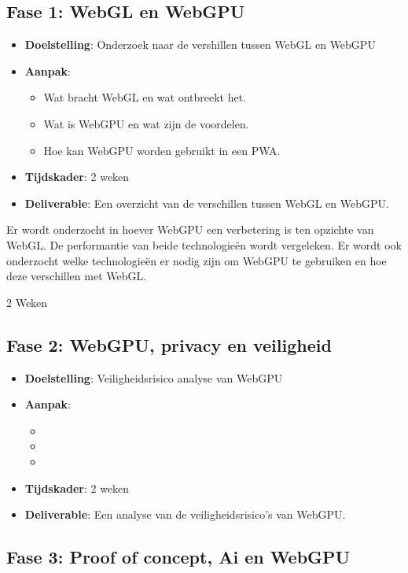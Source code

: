 \documentclass{hogent-article}
\begin{document}
\subsection*{Fase 1: WebGL en WebGPU}

\begin{itemize}
\item \textbf{Doelstelling}: Onderzoek naar de vershillen tussen WebGL en WebGPU
\item \textbf{Aanpak}:
\begin{itemize}
\item Wat bracht WebGL en wat ontbreekt het.
\item Wat is WebGPU en wat zijn de voordelen.
\item Hoe kan WebGPU worden gebruikt in een PWA.
\end{itemize}
\item \textbf{Tijdskader}: 2 weken
\item \textbf{Deliverable}: Een overzicht van de verschillen tussen WebGL en WebGPU.
\end{itemize}

Er wordt onderzocht in hoever WebGPU een verbetering is ten opzichte van WebGL. De performantie van beide technologieën wordt vergeleken. 
Er wordt ook onderzocht welke technologieën er nodig zijn om WebGPU te gebruiken en hoe deze verschillen met WebGL.

2 Weken

\subsection*{Fase 2: WebGPU, privacy en veiligheid}

\begin{itemize}
\item \textbf{Doelstelling}: Veiligheidsrisico analyse van WebGPU
\item \textbf{Aanpak}:
\begin{itemize}
\item 
\item 
\item 
\end{itemize}
\item \textbf{Tijdskader}: 2 weken
\item \textbf{Deliverable}: Een analyse van de veiligheidsrisico's van WebGPU.
\end{itemize}

\subsection*{Fase 3: Proof of concept, Ai en WebGPU}
\end{document}

